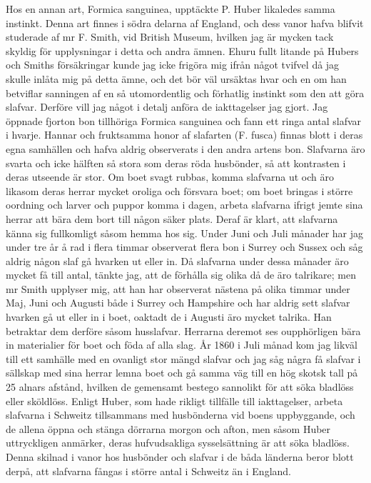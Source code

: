 Hos en annan art, Formica sanguinea, upptäckte P. Huber likaledes samma instinkt. Denna art finnes i södra delarna af England, och dess vanor hafva blifvit studerade af mr F. Smith, vid British Museum, hvilken jag är mycken tack skyldig för upplysningar i detta och andra ämnen. Ehuru fullt litande på Hubers och Smiths försäkringar kunde jag icke frigöra mig ifrån något tvifvel då jag skulle inlåta mig på detta ämne, och det bör väl ursäktas hvar och en om han betviflar sanningen af en så utomordentlig och förhatlig instinkt som den att göra slafvar. Derföre vill jag något i detalj anföra de iakttagelser jag gjort. Jag öppnade fjorton bon tillhöriga Formica sanguinea och fann ett ringa antal slafvar i hvarje. Hannar och fruktsamma honor af slafarten (F. fusca) finnas blott i deras egna samhällen och hafva aldrig observerats i den andra artens bon. Slafvarna äro svarta och icke hälften så stora som deras röda husbönder, så att kontrasten i deras utseende är stor. Om boet svagt rubbas, komma slafvarna ut och äro likasom deras herrar mycket oroliga och försvara boet; om boet bringas i större oordning och larver och puppor komma i dagen, arbeta slafvarna ifrigt jemte sina herrar att bära dem bort till någon säker plats. Deraf är klart, att slafvarna känna sig fullkomligt såsom hemma hos sig. Under Juni och Juli månader har jag under tre år å rad i flera timmar observerat flera bon i Surrey och Sussex och såg aldrig någon slaf gå hvarken ut eller in. Då slafvarna under dessa månader äro mycket få till antal, tänkte jag, att de förhålla sig olika då de äro talrikare; men mr Smith upplyser mig, att han har observerat nästena på olika timmar under Maj, Juni och Augusti både i Surrey och Hampshire och har aldrig sett slafvar hvarken gå ut eller in i boet, oaktadt de i Augusti äro mycket talrika. Han betraktar dem derföre såsom husslafvar. Herrarna deremot ses oupphörligen bära in materialier för boet och föda af alla slag. År 1860 i Juli månad kom jag likväl till ett samhälle med en ovanligt stor mängd slafvar och jag såg några få slafvar i sällskap med sina herrar lemna boet och gå samma väg till en hög skotsk tall på 25 alnars afstånd, hvilken de gemensamt bestego sannolikt för att söka bladlöss eller sköldlöss. Enligt Huber, som hade rikligt tillfälle till iakttagelser, arbeta slafvarna i Schweitz tillsammans med husbönderna vid boens uppbyggande, och de allena öppna och stänga dörrarna morgon och afton, men såsom Huber uttryckligen anmärker, deras hufvudsakliga sysselsättning är att söka bladlöss. Denna skilnad i vanor hos husbönder och slafvar i de båda länderna beror blott derpå, att slafvarna fångas i större antal i Schweitz än i England.

